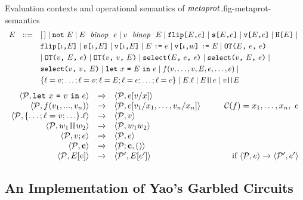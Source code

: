 \begin{fpfig}[t]{Evaluation contexts and operational semantics of $\mathit{metaprot}$.}{fig-metaprot-semantics}
$$
\begin{array}{rcl@{\hspace{3mm}}r}
E &::=& [\,] \mid \enot\ E \mid E\ \bop\ e \mid v\ \bop\ E \mid  \flip{E}{e} \mid \secret{E}{e} \mid \view{E}{e} \mid \oracle{E} \mid  \\[1mm]
& & \flip{\cid}{E} \mid \secret{\cid}{E} \mid \view{\cid}{E} \mid \send{E}{e} \mid \send{\view{\cid}{w}}{E} \mid \OT{E}{e}{e} \\[1mm]
& & \mid \OT{v}{E}{e} \mid \OT{v}{v}{E} \mid \select{E}{e}{e} \mid \select{v}{E}{e} \mid \\[1mm]
& & \select{v}{v}{E} \mid \elet{x}{E}{e} \mid f(v,\ldots,v,E,e,\ldots,e) \mid \\[1mm]
& & \{ \flab = v;\ldots;\flab = v;\flab = E;\flab = e;\ldots;\flab = e \} \mid E.\flab \mid E\concat e \mid v \concat E
\end{array}
$$
\medskip
$$
\begin{array}{rcl@{\hspace{10mm}}r}
\config{\prog}{\elet{x}{v}{e}} &\redx& \config{\prog}{e[v/x]}\\
\config{\prog}{f(v_1,...,v_n)} &\redx&
\config{\prog}{e[v_1/x_1,\ldots,v_n/x_n]} & 
 \codebase(f) = x_1,\ldots,x_n,\ e\\
\config{\prog}{\{\ldots; \flab = v; \ldots\}.\flab} &\redx&
 \config{\prog}{v}\\
 \config{\prog}{w_1\concat w_2} &\redx& \config{\prog}{w_1w_2}\\
 \config{\prog}{v;e} &\redx& \config{\prog}{e}\\
\config{\prog}{\instr} &\redx& \config{\prog;\instr}{()}\\
\config{\prog}{E[e]} &\redx& \config{\prog'}{E[e']} & \text{if}\ \config{\prog}{e} \redx \config{\prog'}{e'} 
\end{array}
$$
\end{fpfig}

\subsection{An Implementation of Yao's Garbled Circuits}
\label{section-metalang-ygc}






